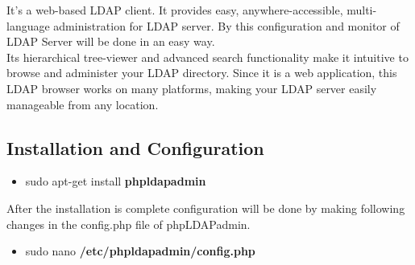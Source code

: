 \documentclass[12pt]{report}
\begin{document}
	It’s a web-based LDAP client. It provides easy, anywhere-accessible, multi-language administration for LDAP server. By this configuration and monitor of LDAP Server will be done in an easy way. \\
\underline{} \newline
Its hierarchical tree-viewer and advanced search functionality make it intuitive to browse and administer your LDAP directory. Since it is a web application, this LDAP browser works on many platforms, making your LDAP server easily manageable from any location.
\subsection{Installation and Configuration}
	\begin{itemize}
	\item sudo apt-get install \textbf{phpldapadmin}
	\end{itemize}
	
	After the installation is complete configuration will be done by making following changes in the
config.php file of phpLDAPadmin.
	\begin{itemize}
	\item sudo nano \textbf{/etc/phpldapadmin/config.php}
	\end{itemize}

	
\end{document}
